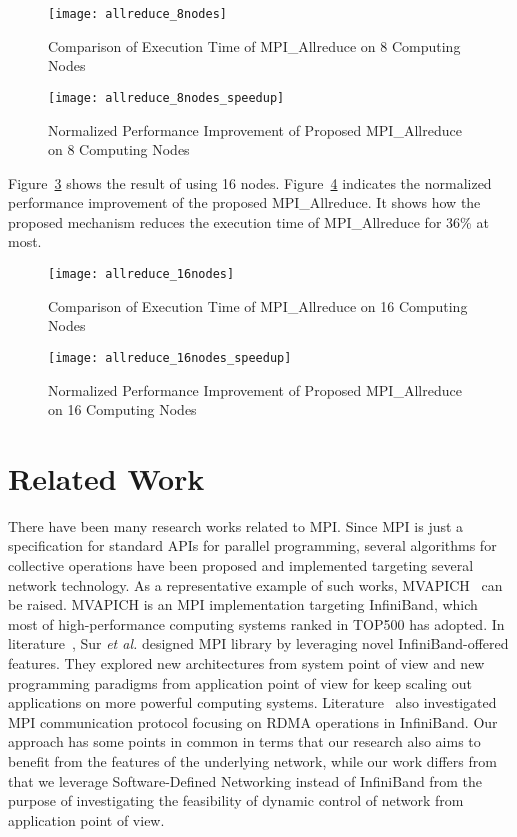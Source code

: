 \begin{figure}
    \centering
    \texttt{[image: allreduce\_8nodes]}
    \caption{Comparison of Execution Time of MPI\_Allreduce on 8 Computing Nodes}%
    \label{fig:evaluation-8nodes}
\end{figure}

\begin{figure}
    \centering
    \texttt{[image: allreduce\_8nodes\_speedup]}
    \caption{Normalized Performance Improvement of Proposed MPI\_Allreduce on 8 Computing Nodes}%
    \label{fig:evaluation-8nodes-normalized}
\end{figure}

Figure~\ref{fig:evaluation-16nodes} shows the result of using 16 nodes.
Figure~\ref{fig:evaluation-16nodes-normalized} indicates the normalized
performance improvement of the proposed MPI\_Allreduce. It
shows how the proposed mechanism reduces the execution time of
MPI\_Allreduce for 36\% at most.

\begin{figure}
    \centering
    \texttt{[image: allreduce\_16nodes]}
    \caption{Comparison of Execution Time of MPI\_Allreduce on 16 Computing Nodes}%
    \label{fig:evaluation-16nodes}
\end{figure}

\begin{figure}
    \centering
    \texttt{[image: allreduce\_16nodes\_speedup]}
    \caption{Normalized Performance Improvement of Proposed MPI\_Allreduce on 16 Computing Nodes}%
    \label{fig:evaluation-16nodes-normalized}
\end{figure}

\section{Related Work}\label{sec:iii-related-work}

There have been many research works related to MPI\@. Since MPI is just a
specification for standard APIs for parallel programming, several algorithms
for collective operations have been proposed and implemented targeting several
network technology. As a representative example of such works,
MVAPICH~\autocite{mvapich} can be raised. MVAPICH is an MPI implementation
targeting InfiniBand, which most of high-performance computing systems ranked
in TOP500 has adopted. In literature~\autocite{PjesivacGrbovic2011}, Sur \emph{et
al.} designed MPI library by leveraging novel InfiniBand-offered features.
They explored new architectures from system point of view and new programming
paradigms from application point of view for keep scaling out applications on
more powerful computing systems. Literature~\autocite{Jiuxing2004} also
investigated MPI communication protocol focusing on RDMA operations in
InfiniBand. Our approach has some points in common in terms that our research
also aims to benefit from the features of the underlying network, while our
work differs from that we leverage Software-Defined Networking instead of
InfiniBand from the purpose of investigating the feasibility of dynamic
control of network from application point of view.

